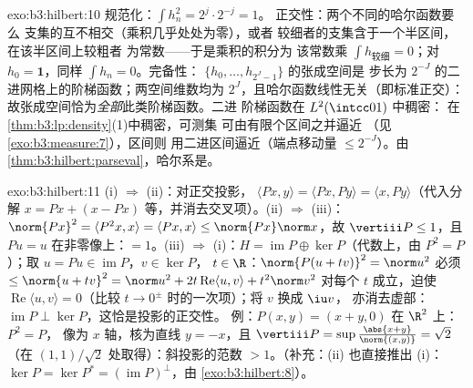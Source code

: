 \begin{solution}{exo:b3:hilbert:10}
规范化：$\int h_n^2 = 2^j\cdot 2^{-j} = 1$。
正交性：两个不同的哈尔函数要么
支集的互不相交（乘积几乎处处为零），或者
较细者的支集含于一个半区间，在该半区间上较粗者
为常数——于是乘积的积分为
该常数乘 $\int h_{\text{较细}} = 0$；对 $h_0
= \mathbf 1$，同样 $\int h_n = 0$。完备性：
$\{h_0, \dots, h_{2^J-1}\}$ 的张成空间是
步长为 $2^{-J}$ 的二进网格上的阶梯函数；两空间维数均为
$2^J$，且哈尔函数线性无关（即标准正交）：
故张成空间恰为\emph{全部}此类阶梯函数。二进
阶梯函数在 $L^2(\intcc01)$ 中稠密：
在\cref{thm:b3:lp:density}(1)中稠密，可测集
可由有限个区间之并逼近
（见\cref{exo:b3:measure:7}），区间则
用二进区间逼近（端点移动量 $\leq 2^{-J}$）。由
\cref{thm:b3:hilbert:parseval}，哈尔系是。
\end{solution}

\begin{solution}{exo:b3:hilbert:11}
(i) $\Rightarrow$ (ii)：对正交投影，
$\langle Px, y\rangle = \langle Px, Py\rangle = \langle x,
Py\rangle$（代入分解 $x = Px + (x - Px)$
等，并消去交叉项）。(ii) $\Rightarrow$ (iii)：
$\norm{Px}^2 = \langle P^2x, x\rangle = \langle Px, x\rangle
\leq \norm{Px}\norm x$，故 $\vertiii P \leq 1$，且 $Pu = u$
在非零像上：$= 1$。(iii) $\Rightarrow$ (i)：$H =
\operatorname{im}P \oplus \ker P$（代数上，由 $P^2
= P$）；取 $u = Pu \in \operatorname{im}P$，$v \in \ker P$，
$t \in \R$：$\norm{P(u + tv)}^2 = \norm u^2$ 必须 $\leq
\norm{u + tv}^2 = \norm u^2 + 2t\operatorname{Re}\langle u,
v\rangle + t^2\norm v^2$ 对每个 $t$ 成立，迫使
$\operatorname{Re}\langle u, v\rangle = 0$（比较
$t \to 0^\pm$ 时的一次项）；将 $v$ 换成 $\iu v$，
亦消去虚部：$\operatorname{im}P \perp
\ker P$，这恰是投影的正交性。
例：$P(x, y) = (x + y, 0)$ 在 $\R^2$ 上：$P^2 = P$，
像为 $x$ 轴，核为直线 $y = -x$，且
$\vertiii P = \sup\frac{\abs{x+y}}{\norm{(x,y)}} = \sqrt2$
（在 $(1,1)/\sqrt2$ 处取得）：斜投影的范数
$> 1$。（补充：(ii) 也直接推出 (i)：
$\ker P = \ker P^* = (\operatorname{im}P)^\perp$，由
\cref{exo:b3:hilbert:8}）。
\end{solution}


